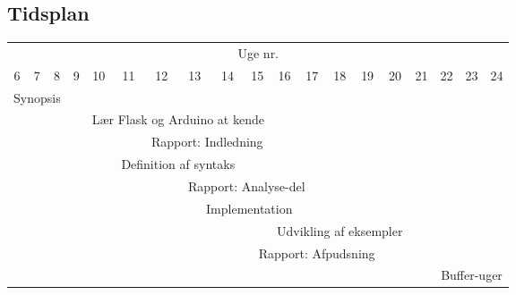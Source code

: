 \documentclass[a4paper,oneside, draft]{memoir}
\begin{document}
\appendix 

\begin{landscape}
\chapter{Tidsplan}
\begin{center}



\begin{tabular}{ccccccccccccccccccc}
\multicolumn{19}{c}{Uge nr.} \\
6 & 7 & 8 & 9 & 10 & 11 & 12 & 13 & 14 & 15 & 16 & 17 & 18 &
19 & 20 & 21 & 22 & 23 & 24\\ \hline \hline
\multicolumn{3}{c}{\cellcolor{black} \color{white}  Synopsis } \\  
& & \multicolumn{2}{c}{\cellcolor{cyan} \color{white}} &
\multicolumn{6}{l}{Lær Flask og Arduino at kende} \\
& & & \multicolumn{3}{c}{\cellcolor{lightgrey} \color{white} } &
\multicolumn{6}{l}{Rapport: Indledning} \\
& & & & &  \multicolumn{4}{c}{\cellcolor{magenta} \color{white} Definition af
  syntaks} \\
& & & & & \multicolumn{9}{c}{\cellcolor{grey} \color{white} Rapport: Analyse-del} \\

& & & & & & \multicolumn{7}{c}{\cellcolor{blue} \color{white} Implementation} \\
\multicolumn{10}{r}{} & \multicolumn{5}{c}{\cellcolor{red} Udvikling
  af eksempler}
 \\
\multicolumn{14}{r}{Rapport: Afpudsning} & \multicolumn{2}{c}{\cellcolor{yellow}}
 \\
\multicolumn{16}{r}{} & \multicolumn{3}{c}{\cellcolor{green} Buffer-uger} \\  
\end{tabular}
\end{center}
\end{landscape}
\end{document}
